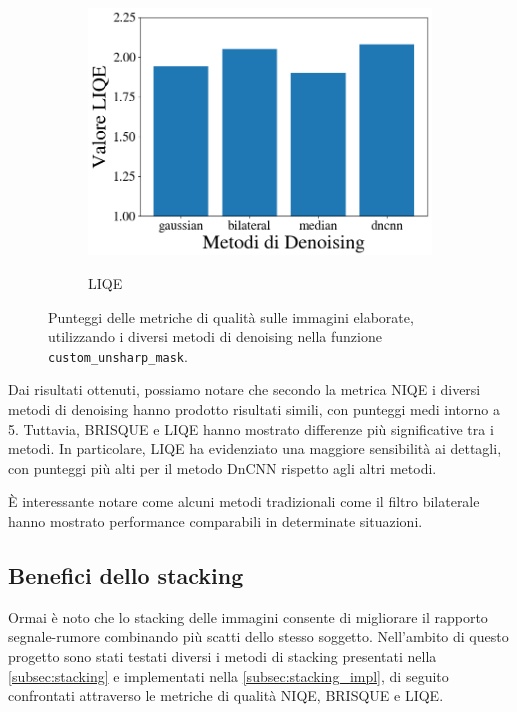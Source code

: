 \begin{figure}[H]
\begin{subfigure}[t]{0.32\textwidth}
        \label{fig:den_brisque}
    \end{subfigure}
    \hfill
    \begin{subfigure}[t]{0.32\textwidth}
        \centering
        \caption{LIQE}
        \includegraphics[width=\linewidth]{../assets/denoising_comparison_LIQE.png}
        \label{fig:den_liqe}
    \end{subfigure}
    \caption{Punteggi delle metriche di qualità sulle immagini elaborate, utilizzando i diversi metodi di denoising nella funzione \texttt{custom\_unsharp\_mask}.} \label{fig:confronto-denoising}
\end{figure}

Dai risultati ottenuti, possiamo notare che secondo la metrica NIQE i diversi metodi di denoising hanno prodotto risultati simili, con punteggi medi intorno a 5. Tuttavia, BRISQUE e LIQE hanno mostrato differenze più significative tra i metodi. In particolare, LIQE ha evidenziato una maggiore sensibilità ai dettagli, con punteggi più alti per il metodo DnCNN rispetto agli altri metodi.

È interessante notare come alcuni metodi tradizionali come il filtro bilaterale hanno mostrato performance comparabili in determinate situazioni.

\subsection{Benefici dello stacking} \label{subsec:analysis_stack}

Ormai è noto che lo stacking delle immagini consente di migliorare il rapporto segnale-rumore combinando più scatti dello stesso soggetto. Nell'ambito di questo progetto sono stati testati diversi i metodi di stacking presentati nella \cref{subsec:stacking} e implementati nella \cref{subsec:stacking_impl}, di seguito confrontati attraverso le metriche di qualità NIQE, BRISQUE e LIQE.

